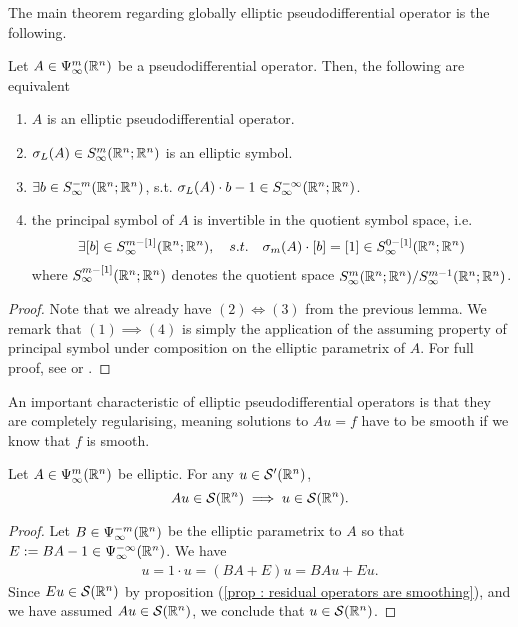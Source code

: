 \documentclass[12pt]{article}
\begin{document}
The main theorem regarding globally elliptic pseudodifferential operator is the following. 
\begin{ftheorem}
    Let $A \in \Psi^{m}_{\infty}({\mathbb R}^n)$ be a pseudodifferential operator. Then, the following are equivalent
    \begin{enumerate}
        \item $A$ is an elliptic pseudodifferential operator.
        
        \item $\sigma_L(A) \in S^{m}_\infty({\mathbb R}^{n}; {\mathbb R}^n)$ is an elliptic symbol.
                
        \item $\exists b \in S^{- m}_\infty({\mathbb R}^{n}; {\mathbb R}^n)$, s.t. $\sigma_L(A) \cdot b -1 \in S^{-\infty }_\infty({\mathbb R}^{n}; {\mathbb R}^n)$. 
        
        \item the principal symbol of $A$ is invertible in the quotient symbol space, i.e. 
        \begin{align*}
        \exists [b] \in S^{m - [1]}_\infty({\mathbb R}^{n}; {\mathbb R}^n), \quad s.t. \quad \sigma_m(A) \cdot [b] = [1] \in S^{0 - [1]}_\infty({\mathbb R}^{n}; {\mathbb R}^n)
        \end{align*}
        where $S^{m-[1]}_\infty({\mathbb R}^{n}; {\mathbb R}^n)$ denotes the quotient space $S^{m}_\infty({\mathbb R}^{n}; {\mathbb R}^n) / S^{m -1}_\infty({\mathbb R}^{n}; {\mathbb R}^n)$. 

    \end{enumerate}
\end{ftheorem}
\begin{proof}
    Note that we already have $(2) \iff (3)$ from the previous lemma. We remark that $(1) \implies (4)$ is simply the application of the assuming property of principal symbol under composition on the elliptic parametrix of $A$. For full proof, see \cite{Vasy2015-oo} or \cite{rbm_intro_microlocal}. 
    
\end{proof}


An important characteristic of elliptic pseudodifferential operators is that they are completely regularising, meaning solutions to $Au = f$ have to be smooth if we know that $f$ is smooth. 

\begin{fprop}
    Let $A \in \Psi^{m}_{\infty}({\mathbb R}^n)$  be  elliptic. For any $u \in \mathcal{S}'({\mathbb R}^n)$, 
    $$Au \in \mathcal{S}({\mathbb R}^n) \implies u \in \mathcal{S}({\mathbb R}^n). $$ 
\end{fprop}
\begin{proof}
    Let $B \in \Psi^{-m}_{\infty}({\mathbb R}^n)$ be the elliptic parametrix to $A$ so that $E:= BA - 1 \in \Psi^{-\infty }_{\infty}({\mathbb R}^n)$. We have
    \begin{align*}
    u = 1 \cdot u = (BA + E)u = BAu + Eu. 
    \end{align*}
    Since $Eu \in \mathcal{S}({\mathbb R}^n)$ by proposition (\ref{prop : residual operators are smoothing}), and  we have assumed $Au \in \mathcal{S}({\mathbb R}^n)$, we conclude that $u \in \mathcal{S}({\mathbb R}^n)$. 
    
\end{proof}
\end{document}
